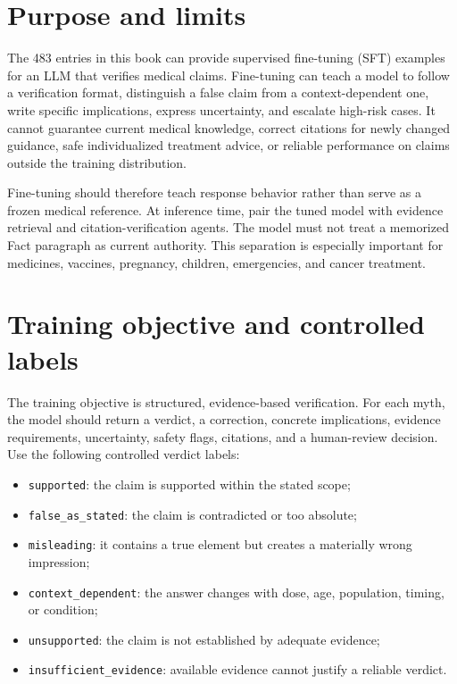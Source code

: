 \documentclass[11pt,oneside]{book}
\begin{document}
\section{Purpose and limits}

The 483 entries in this book can provide supervised fine-tuning (SFT) examples for an LLM that verifies medical claims. Fine-tuning can teach a model to follow a verification format, distinguish a false claim from a context-dependent one, write specific implications, express uncertainty, and escalate high-risk cases. It cannot guarantee current medical knowledge, correct citations for newly changed guidance, safe individualized treatment advice, or reliable performance on claims outside the training distribution.

Fine-tuning should therefore teach response behavior rather than serve as a frozen medical reference. At inference time, pair the tuned model with evidence retrieval and citation-verification agents. The model must not treat a memorized Fact paragraph as current authority. This separation is especially important for medicines, vaccines, pregnancy, children, emergencies, and cancer treatment.

\section{Training objective and controlled labels}

The training objective is structured, evidence-based verification. For each myth, the model should return a verdict, a correction, concrete implications, evidence requirements, uncertainty, safety flags, citations, and a human-review decision. Use the following controlled verdict labels:

\begin{itemize}
\item \texttt{supported}: the claim is supported within the stated scope;
\item \texttt{false\_as\_stated}: the claim is contradicted or too absolute;
\item \texttt{misleading}: it contains a true element but creates a materially wrong impression;
\item \texttt{context\_dependent}: the answer changes with dose, age, population, timing, or condition;
\item \texttt{unsupported}: the claim is not established by adequate evidence;
\item \texttt{insufficient\_evidence}: available evidence cannot justify a reliable verdict.
\end{itemize}
\end{document}
